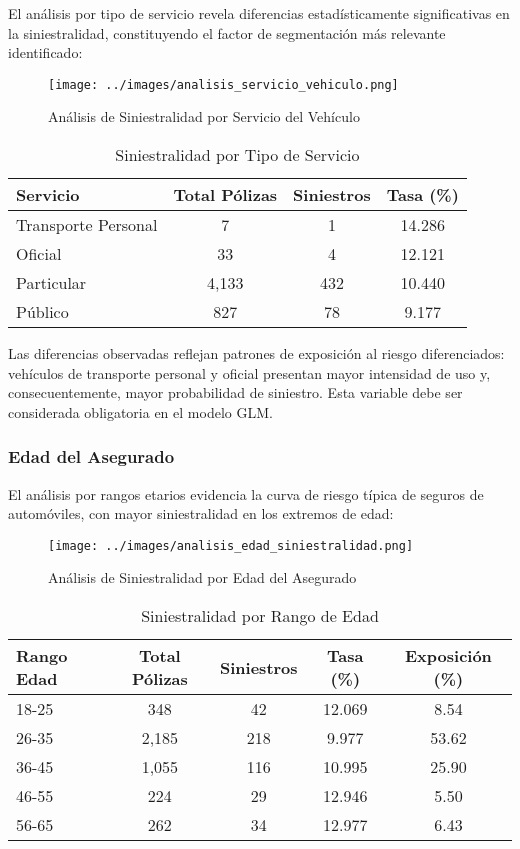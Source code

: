 El análisis por tipo de servicio revela diferencias estadísticamente significativas en la siniestralidad, constituyendo el factor de segmentación más relevante identificado:

\begin{figure}[H]
\centering
\texttt{[image: ../images/analisis\_servicio\_vehiculo.png]}
\caption{Análisis de Siniestralidad por Servicio del Vehículo}
\end{figure}

\begin{table}[H]
\centering
\caption{Siniestralidad por Tipo de Servicio}
\begin{tabular}{|l|c|c|c|}
\hline
\textbf{Servicio} & \textbf{Total Pólizas} & \textbf{Siniestros} & \textbf{Tasa (\%)} \\
\hline
Transporte Personal & 7 & 1 & 14.286 \\
Oficial & 33 & 4 & 12.121 \\
Particular & 4,133 & 432 & 10.440 \\
Público & 827 & 78 & 9.177 \\
\hline
\end{tabular}
\end{table}

Las diferencias observadas reflejan patrones de exposición al riesgo diferenciados: vehículos de transporte personal y oficial presentan mayor intensidad de uso y, consecuentemente, mayor probabilidad de siniestro. Esta variable debe ser considerada obligatoria en el modelo GLM.

\subsubsection{Edad del Asegurado}

El análisis por rangos etarios evidencia la curva de riesgo típica de seguros de automóviles, con mayor siniestralidad en los extremos de edad:

\begin{figure}[H]
\centering
\texttt{[image: ../images/analisis\_edad\_siniestralidad.png]}
\caption{Análisis de Siniestralidad por Edad del Asegurado}
\end{figure}

\begin{table}[H]
\centering
\caption{Siniestralidad por Rango de Edad}
\begin{tabular}{|l|c|c|c|c|}
\hline
\textbf{Rango Edad} & \textbf{Total Pólizas} & \textbf{Siniestros} & \textbf{Tasa (\%)} & \textbf{Exposición (\%)} \\
\hline
18-25 & 348 & 42 & 12.069 & 8.54 \\
26-35 & 2,185 & 218 & 9.977 & 53.62 \\
36-45 & 1,055 & 116 & 10.995 & 25.90 \\
46-55 & 224 & 29 & 12.946 & 5.50 \\
56-65 & 262 & 34 & 12.977 & 6.43 \\
\hline
\end{tabular}
\end{table}

